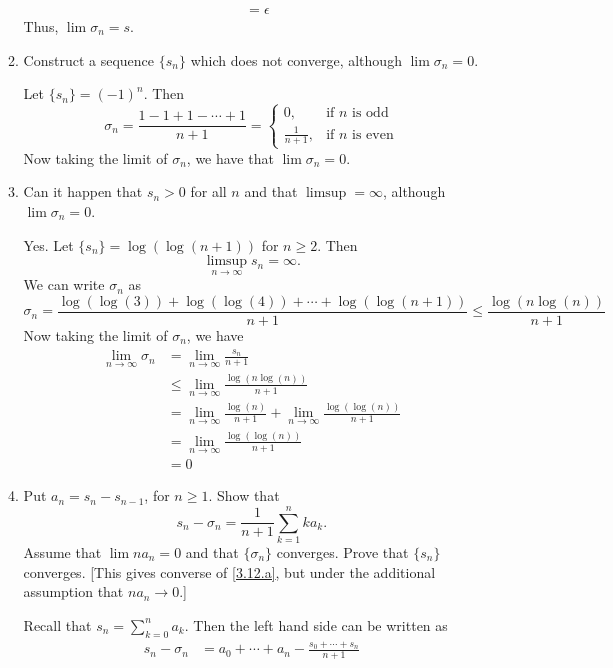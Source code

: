 \begin{enumerate}
\begin{enumerate}[label = (\alph*), ref = \theenumi{} (\alph*)]
\begin{align*}
      & = \epsilon
    \end{align*}
    Thus, \(\lim\sigma_n = s\).
  \item
    Construct a sequence \(\{s_n\}\) which does not converge, although
    \(\lim\sigma_n = 0\).
    \par\smallskip
    Let \(\{s_n\} = (-1)^n\).
    Then
    \[
    \sigma_n = \frac{1 - 1 + 1 - \cdots + 1}{n + 1} =
    \begin{cases}
      0, & \text{if \(n\) is odd}\\
      \frac{1}{n + 1}, & \text{if \(n\) is even}
    \end{cases}
    \]
    Now taking the limit of \(\sigma_n\), we have that \(\lim\sigma_n = 0\).
  \item
    Can it happen that \(s_n > 0\) for all \(n\) and that \(\limsup = \infty\),
    although \(\lim\sigma_n = 0\).
    \par\smallskip
    Yes.
    Let \(\{s_n\} = \log(\log(n + 1))\) for \(n\geq 2\).
    Then
    \[
    \limsup_{n\to\infty} s_n = \infty.
    \]
    We can write \(\sigma_n\) as
    \[
    \sigma_n = \frac{\log(\log(3)) + \log(\log(4)) + \cdots +
      \log(\log(n + 1))}{n + 1}\leq\frac{\log(n\log(n))}{n + 1}
    \]
    Now taking the limit of \(\sigma_n\), we have
    \begin{align*}
      \lim_{n\to\infty}\sigma_n
      & = \lim_{n\to\infty}\frac{s_n}{n + 1}\\
      & \leq \lim_{n\to\infty}\frac{\log(n\log(n))}{n + 1}\\
      & = \lim_{n\to\infty}\frac{\log(n)}{n + 1} +
        \lim_{n\to\infty}\frac{\log(\log(n))}{n + 1}\\
      & = \lim_{n\to\infty}\frac{\log(\log(n))}{n + 1}\\
      & = 0
    \end{align*}
  \item
    Put \(a_n = s_n - s_{n - 1}\), for \(n\geq 1\).
    Show that
    \[
    s_n - \sigma_n = \frac{1}{n + 1}\sum_{k = 1}^nka_k.
    \]
    Assume that \(\lim na_n = 0\) and that \(\{\sigma_n\}\) converges.
    Prove that \(\{s_n\}\) converges.
    [This gives converse of \cref{3.12.a}, but under the additional assumption
    that \(na_n\to 0\).]
    \par\smallskip
    Recall that \(s_n = \sum_{k = 0}^na_k\).
    Then the left hand side can be written as
    \begin{align*}
      s_n - \sigma_n & = a_0 + \cdots + a_n -
                       \frac{s_0 + \cdots + s_n}{n + 1}\\

\end{align*}
\end{enumerate}
\end{enumerate}
